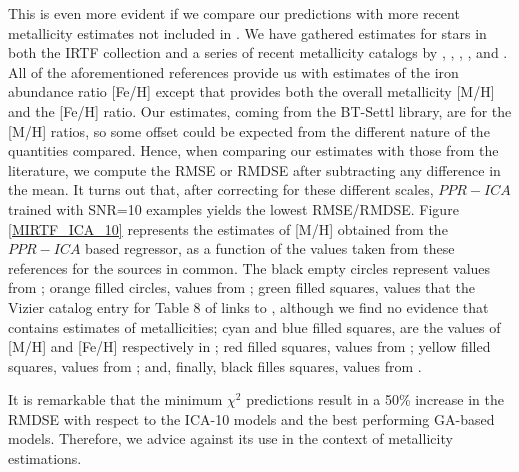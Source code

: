 This is even more evident if we compare our predictions with more
recent metallicity estimates not included in \cite{cesetti}. We have
gathered estimates for stars in both the IRTF collection and a series
of recent metallicity catalogs
by \cite{RA2012}, \cite{NevesIII}, \cite{Newton2014}, \cite{Gaidos2015},
and \cite{Mann2015}. All of the aforementioned references provide us
with estimates of the iron abundance ratio [Fe/H] except \cite{RA2012}
that provides both the overall metallicity [M/H] and the [Fe/H]
ratio. Our estimates, coming from the BT-Settl library, are for the
[M/H] ratios, so some offset could be expected from the different
nature of the quantities compared. Hence, when comparing our estimates
with those from the literature, we compute the RMSE or RMDSE after
subtracting any difference in the mean. It turns out that, after
correcting for these different scales, $PPR-ICA$ trained with SNR=10
examples yields the lowest RMSE/RMDSE. Figure \ref{MIRTF_ICA_10}
represents the estimates of [M/H] obtained from the $PPR-ICA$ based
regressor, as a function of the values taken from these references for
the sources in common. The black empty circles represent values
from \cite{cesetti} ; orange filled circles, values
from \cite{NevesIII}; green filled squares, values that the Vizier
catalog entry for Table 8 of \cite{NevesIII} links to \cite{Jao},
although we find no evidence that \cite{Jao} contains estimates of
metallicities; cyan and blue filled squares, are the values of [M/H]
and [Fe/H] respectively in \cite{RA2012}; red filled squares, values
from \cite{Mann2015}; yellow filled squares, values
from \cite{Newton2014}; and, finally, black filles squares, values
from \cite{Gaidos2015}.

It is remarkable that the minimum $\chi^2$ predictions result in a
50\% increase in the RMDSE with respect to the ICA-10 models and the
best performing GA-based models. Therefore, we advice against its use
in the context of metallicity estimations. 

